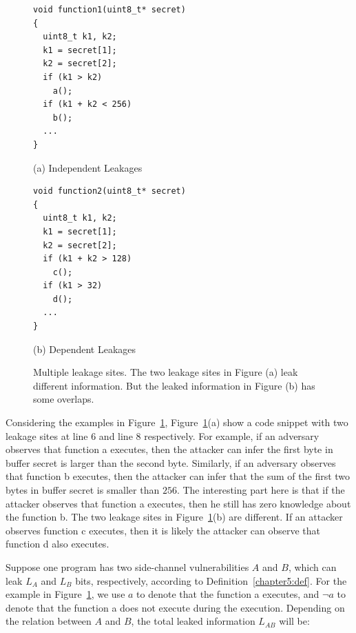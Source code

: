 \begin{figure}[h]
\begin{minipage}{0.4\linewidth}
\begin{lstlisting}
void function1(uint8_t* secret)
{
  uint8_t k1, k2;
  k1 = secret[1];
  k2 = secret[2];
  if (k1 > k2)
    a();
  if (k1 + k2 < 256)
    b();
  ...
}
\end{lstlisting}\caption*{(a) Independent Leakages}
\end{minipage}
\hfill
\begin{minipage}{0.4\linewidth}
\begin{lstlisting}
void function2(uint8_t* secret)
{
  uint8_t k1, k2;
  k1 = secret[1];
  k2 = secret[2];
  if (k1 + k2 > 128)
    c();
  if (k1 > 32)
    d();
  ...
}
\end{lstlisting} \caption*{(b) Dependent Leakages}
\end{minipage}
\caption{Multiple leakage sites. The two leakage sites in Figure (a) leak different information. But the leaked information in Figure (b) has some overlaps. }\label{chapter5:fig:multiple}
\end{figure}

Considering the examples in Figure~\ref{chapter5:fig:multiple}, Figure~\ref{chapter5:fig:multiple}(a) show a code snippet with two leakage sites at line 6 and line 8 respectively. For example, if an adversary observes that function \textsf{a} executes, then the attacker can infer the first byte in buffer \textsf{secret} is larger than the second byte.  Similarly, if an adversary observes that function \textsf{b} executes, then the attacker can infer that the sum of the first two bytes in buffer \textsf{secret} is smaller than $256$. The interesting part here is that if the attacker observes that function \textsf{a} executes, then he still has zero knowledge about the function \textsf{b}. The two leakage sites in Figure~\ref{chapter5:fig:multiple}(b) are different. If an attacker observes function \textsf{c} executes, then it is likely the attacker can observe that function \textsf{d} also executes. 

Suppose one program has two side-channel vulnerabilities $A$ and $B$, which can leak $L_A$ and $L_B$ bits, respectively, according to Definition~\ref{chapter5:def}. 
For the example in Figure~\ref{chapter5:fig:multiple}, we use $a$ to denote that the function \textsf{a} executes, and $\lnot a$ to denote that the function \textsf{a} does not execute during the execution.
Depending on the relation between $A$ and $B$, the total leaked information $L_{\mathit{AB}}$ will be:

